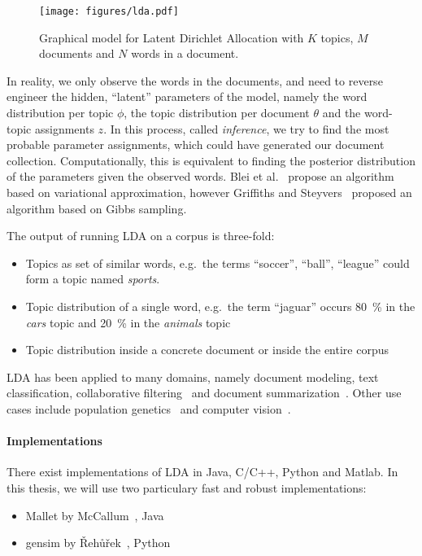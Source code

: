 \documentclass{sig-alternate-05-2015}
\begin{document}
\begin{figure}
       \centering
       \texttt{[image: figures/lda.pdf]}
       \caption{Graphical model for Latent Dirichlet Allocation with $K$ topics, $M$ documents and $N$ words in a document.}
       \label{fig:lda}
\end{figure}

In reality, we only observe the words in the documents, and need to reverse engineer the hidden, ``latent'' parameters of the model, namely the word distribution per topic $\phi$, the topic distribution per document $\theta$ and the word-topic assignments $z$.
In this process, called \emph{inference}, we try to find the most probable parameter assignments, which could have generated our document collection.
Computationally, this is equivalent to finding the posterior distribution of the parameters given the observed words.
Blei et al.~\cite{Blei2003} propose an algorithm based on variational approximation, however Griffiths and Steyvers~\cite{Griffiths2004} proposed an algorithm based on Gibbs sampling.

The output of running LDA on a corpus is three-fold:
\begin{itemize}
       \item Topics as set of similar words, e.g.\ the terms ``soccer'', ``ball'', ``league'' could form a topic named \emph{sports}.
       \item Topic distribution of a single word, e.g.\ the term ``jaguar'' occurs 80~\% in the \emph{cars} topic and 20~\% in the \emph{animals} topic
       \item Topic distribution inside a concrete document or inside the entire corpus
\end{itemize}

LDA has been applied to many domains, namely document modeling, text classification, collaborative filtering~\cite{Blei2003} and document summarization~\cite{Wang2009}.
Other use cases include population genetics~\cite{Pritchard2000} and computer vision~\cite{LiFei-Fei2005}.

\paragraph{Implementations}
There exist implementations of LDA in Java, C/C++, Python and Matlab.
In this thesis, we will use two particulary fast and robust implementations:
\begin{itemize}
       \item Mallet by McCallum~\cite{McCallum2002}, Java
       \item gensim by {\v R}eh{\r u}{\v r}ek~\cite{Rehurek2010}, Python
\end{itemize}
\end{document}
